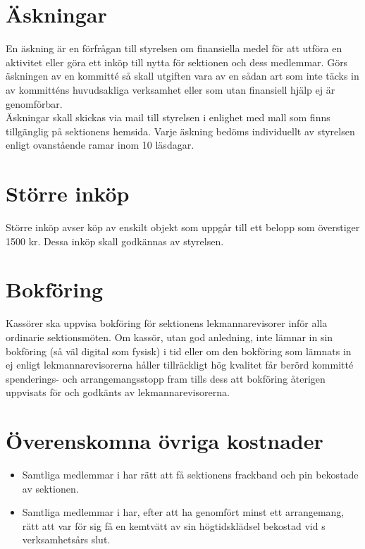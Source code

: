 \documentclass[11pt, includeaddress]{classes/cthit}
\begin{document}
\section{Äskningar}
En äskning är en förfrågan till styrelsen om finansiella medel för att utföra en aktivitet eller göra ett inköp till nytta för sektionen och dess medlemmar. Görs äskningen av en kommitté så skall utgiften vara av en sådan art som inte täcks in av kommitténs huvudsakliga verksamhet eller som utan finansiell hjälp ej är genomförbar. \\

Äskningar skall skickas via mail till styrelsen i enlighet med mall som finns tillgänglig på sektionens hemsida. Varje äskning bedöms individuellt av styrelsen enligt ovanstående ramar inom 10 läsdagar.

\section{Större inköp}
Större inköp avser köp av enskilt objekt som uppgår till ett belopp som överstiger 1500 kr. Dessa inköp skall godkännas av styrelsen.

\section{Bokföring}
Kassörer ska uppvisa bokföring för sektionens lekmannarevisorer inför alla ordinarie sektionsmöten. Om kassör, utan god anledning, inte lämnar in sin bokföring (så väl digital som fysisk) i tid eller om den bokföring som lämnats in ej enligt lekmannarevisorerna håller tillräckligt hög kvalitet får berörd kommitté spenderings- och arrangemangsstopp fram tills dess att bokföring återigen uppvisats för och godkänts av lekmannarevisorerna.

\section{Överenskomna övriga kostnader}
\begin{itemize}
	\item Samtliga medlemmar i \FANBARERIT{} har rätt att få sektionens frackband och pin bekostade av sektionen.
	\item Samtliga medlemmar i \FANBARERIT{} har, efter att ha genomfört minst ett arrangemang, rätt att var för sig få en kemtvätt av sin högtidsklädsel bekostad vid \FANBARERIT{}s verksamhetsårs slut.
\end{itemize}
\end{document}
